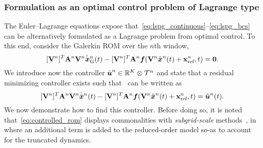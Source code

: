 \subsubsection{Formulation as an optimal control problem of Lagrange type}\label{sec:optimal_control} 
The Euler--Lagrange equations expose that~\eqref{eq:lspg_continuous}--\eqref{eq:lspg_bcs} can be alternatively formulated as a Lagrange
problem from optimal control. To this end, consider the Galerkin ROM over the $n$th window, 
$$ \basisspaceTArg{n} \stweightingMatArgt{n}{t} \basisspaceArg{n}
 \genstateGalerkinDotArg{n}{t} - \basisspaceTArg{n} \stweightingMatArgt{n}{t}
\velocity(\veloargsromn) = \bz.$$
We introduce now the controller $\controllerArgnt{n} \in \RR{\romdim} \otimes \timeSpaceArg{n}$ 
and state that a residual minimizing controller exists such that \methodAcronym\ can be written as 
\begin{equation}\label{eq:controlled_rom}
 \basisspaceTArg{n}
\stweightingMatArgt{n}{t} \basisspaceArg{n} \genstateDotArg{n}{t}  - \basisspaceTArg{n}
\stweightingMatArgt{n}{t}\velocity(\veloargsromn) = \controllerArg{n}{t}. 
 \end{equation}
We now demonstrate how to find this controller.
Before doing so, it is noted that~\eqref{eq:controlled_rom} displays commonalities with \textit{subgrid-scale}
methods~\cite{iliescu_pod_eddyviscosity,iliescu_vms_pod_ns,iliescu_ciazzo_residual_rom,parish_apg,wentland_apg,Wang:269133,San2018},
in where an additional term is added to the reduced-order model so-as to
account for the truncated dynamics. 

